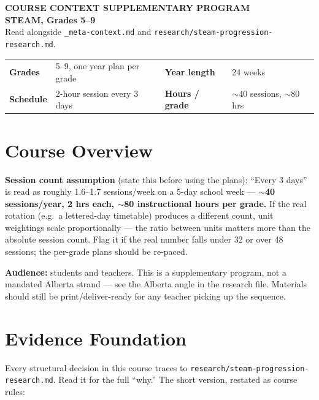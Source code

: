 \documentclass[10pt, a4paper]{article}
\begin{document}
\begin{tcolorbox}[colback=accentlight, colframe=accent, leftrule=5pt,
    toprule=0.6pt, bottomrule=0.6pt, rightrule=0.6pt,
    top=8pt, bottom=8pt, left=12pt]
  {\small\bfseries\color{accent}COURSE CONTEXT \textperiodcentered{} SUPPLEMENTARY PROGRAM}\\[4pt]
  {\LARGE\bfseries STEAM, Grades 5--9}\\[3pt]
  {\small\color{slate}Read alongside \texttt{\_meta-context.md} and \texttt{research/steam-progression-research.md}.}
\end{tcolorbox}
\vspace{10pt}

\begin{tabularx}{\linewidth}{@{}l X l X@{}}
\textbf{Grades} & 5--9, one year plan per grade & \textbf{Year length} & 24 weeks \\
\textbf{Schedule} & 2-hour session every 3 days & \textbf{Hours / grade} & $\sim$40 sessions, $\sim$80 hrs \\
\end{tabularx}
\vspace{4pt}

\section{Course Overview}

\textbf{Session count assumption} (state this before using the plans): ``Every 3 days'' is read as roughly 1.6--1.7 sessions/week on a 5-day school week --- \textbf{$\sim$40 sessions/year, 2 hrs each, $\sim$80 instructional hours per grade.} If the real rotation (e.g.\ a lettered-day timetable) produces a different count, unit weightings scale proportionally --- the ratio between units matters more than the absolute session count. Flag it if the real number falls under 32 or over 48 sessions; the per-grade plans should be re-paced.

\textbf{Audience:} students and teachers. This is a supplementary program, not a mandated Alberta strand --- see the Alberta angle in the research file. Materials should still be print/deliver-ready for any teacher picking up the sequence.

\section{Evidence Foundation}

Every structural decision in this course traces to \texttt{research/steam-progression-research.md}. Read it for the full ``why.'' The short version, restated as course rules:
\end{document}
